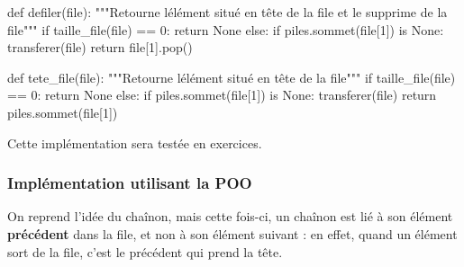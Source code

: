 \documentclass[
  a4paper,
  DIV=11,
  numbers=noendperiod]{scrartcl}
\newenvironment{Shaded}{\begin{snugshade}}{\end{snugshade}}
\newcommand{\BuiltInTok}[1]{\textcolor[rgb]{0.00,0.23,0.31}{#1}}
\newcommand{\CommentTok}[1]{\textcolor[rgb]{0.37,0.37,0.37}{#1}}
\newcommand{\ControlFlowTok}[1]{\textcolor[rgb]{0.00,0.23,0.31}{#1}}
\newcommand{\DecValTok}[1]{\textcolor[rgb]{0.68,0.00,0.00}{#1}}
\newcommand{\KeywordTok}[1]{\textcolor[rgb]{0.00,0.23,0.31}{#1}}
\newcommand{\NormalTok}[1]{\textcolor[rgb]{0.00,0.23,0.31}{#1}}
\newcommand{\OperatorTok}[1]{\textcolor[rgb]{0.37,0.37,0.37}{#1}}
\newcommand{\VariableTok}[1]{\textcolor[rgb]{0.07,0.07,0.07}{#1}}
\begin{document}
\begin{Shaded}
\begin{Highlighting}[]
\KeywordTok{def}\NormalTok{ defiler(}\BuiltInTok{file}\NormalTok{):}
    \CommentTok{"""Retourne l\textquotesingle{}élément situé en tête de la file et le supprime de la file"""}
    \ControlFlowTok{if}\NormalTok{ taille\_file(}\BuiltInTok{file}\NormalTok{) }\OperatorTok{==} \DecValTok{0}\NormalTok{:}
        \ControlFlowTok{return} \VariableTok{None}
    \ControlFlowTok{else}\NormalTok{:}
        \ControlFlowTok{if}\NormalTok{ piles.sommet(}\BuiltInTok{file}\NormalTok{[}\DecValTok{1}\NormalTok{]) }\KeywordTok{is} \VariableTok{None}\NormalTok{:}
\NormalTok{            transferer(}\BuiltInTok{file}\NormalTok{)}
        \ControlFlowTok{return} \BuiltInTok{file}\NormalTok{[}\DecValTok{1}\NormalTok{].pop()}


\KeywordTok{def}\NormalTok{ tete\_file(}\BuiltInTok{file}\NormalTok{):}
    \CommentTok{"""Retourne l\textquotesingle{}élément situé en tête de la file"""}
    \ControlFlowTok{if}\NormalTok{ taille\_file(}\BuiltInTok{file}\NormalTok{) }\OperatorTok{==} \DecValTok{0}\NormalTok{:}
        \ControlFlowTok{return} \VariableTok{None}
    \ControlFlowTok{else}\NormalTok{:}
        \ControlFlowTok{if}\NormalTok{ piles.sommet(}\BuiltInTok{file}\NormalTok{[}\DecValTok{1}\NormalTok{]) }\KeywordTok{is} \VariableTok{None}\NormalTok{:}
\NormalTok{            transferer(}\BuiltInTok{file}\NormalTok{)}
        \ControlFlowTok{return}\NormalTok{ piles.sommet(}\BuiltInTok{file}\NormalTok{[}\DecValTok{1}\NormalTok{])}
\end{Highlighting}
\end{Shaded}

Cette implémentation sera testée en exercices.

\hypertarget{impluxe9mentation-utilisant-la-poo}{%
\subsubsection{Implémentation utilisant la
POO}\label{impluxe9mentation-utilisant-la-poo}}

On reprend l'idée du chaînon, mais cette fois-ci, un chaînon est lié à
son élément \textbf{précédent} dans la file, et non à son élément
suivant : en effet, quand un élément sort de la file, c'est le précédent
qui prend la tête.
\end{document}
